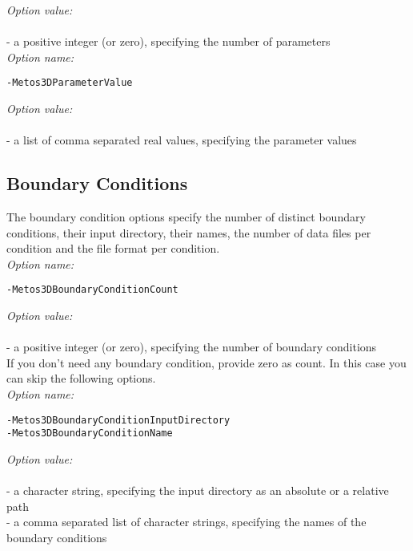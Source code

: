 \documentclass{article}
\begin{document}
\emph{Option value:} \\
\vspace{-0.3cm}\\
- a positive integer (or zero), specifying the number of parameters \\

\emph{Option name:}
\begin{verbatim}
-Metos3DParameterValue
\end{verbatim}

\emph{Option value:} \\
\vspace{-0.3cm}\\
- a list of comma separated real values, specifying the parameter values \\

%
%
\subsection{Boundary Conditions}

The boundary condition options specify the number of distinct boundary conditions,
their input directory, their names, the number of data files per condition
and the file format per condition. \\

\emph{Option name:}
\begin{verbatim}
-Metos3DBoundaryConditionCount
\end{verbatim}

\emph{Option value:} \\
\vspace{-0.3cm}\\
- a positive integer (or zero), specifying the number of boundary conditions \\

If you don't need any boundary condition, provide zero as count.
In this case you can skip the following options. \\

\emph{Option name:}
\begin{verbatim}
-Metos3DBoundaryConditionInputDirectory
-Metos3DBoundaryConditionName
\end{verbatim}

\emph{Option value:} \\
\vspace{-0.3cm}\\
- a character string, specifying the input directory as an absolute or a relative path \\
- a comma separated list of character strings, specifying the names of the boundary conditions \\
\end{document}
